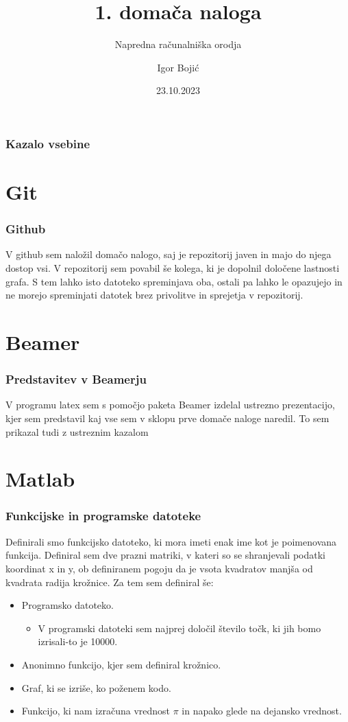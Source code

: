 \documentclass{beamer}
\title{1. domača naloga}
\subtitle{Napredna računalniška orodja}
\author{Igor Bojić}
\institute{Fakulteta za strojništvo}
\date{23.10.2023}
\begin{document}
\frame{\titlepage}
\begin{frame}
    \frametitle{Kazalo vsebine}
    \tableofcontents
\end{frame}
  

\section{Git}
\begin{frame}
\frametitle{Github}
\justifying
V github sem naložil domačo nalogo, saj je repozitorij javen in majo do njega dostop vsi. V repozitorij sem povabil še kolega, ki je dopolnil določene lastnosti grafa. S tem lahko isto datoteko spreminjava oba, ostali pa lahko le opazujejo in ne morejo spreminjati datotek brez privolitve in sprejetja v repozitorij.
\end{frame}

\section{Beamer}

\begin{frame}
\frametitle{Predstavitev v Beamerju}
\justifying
V programu latex sem s pomočjo paketa Beamer izdelal ustrezno prezentacijo, kjer sem predstavil kaj vse sem v sklopu prve domače naloge naredil. To sem prikazal tudi z ustreznim kazalom 
\end{frame}


\section{Matlab}

\begin{frame}
\frametitle{Funkcijske in programske datoteke}

Definirali smo funkcijsko datoteko, ki mora imeti enak ime kot je poimenovana funkcija. Definiral sem dve prazni matriki, v kateri so se shranjevali podatki koordinat x in y, ob definiranem pogoju da je vsota kvadratov manjša od  kvadrata radija krožnice. Za tem sem definiral še:
\begin{itemize}
    \item Programsko datoteko.
    \begin{itemize}
        \item V programski datoteki sem najprej določil število točk, ki jih bomo izrisali-to je 10000.
        \end{itemize}
    \item Anonimno funkcijo, kjer sem definiral krožnico.
    \item Graf, ki se izriše, ko poženem kodo.
    \item Funkcijo, ki nam izračuna vrednost $\pi$ in napako glede na dejansko vrednost. 
\end{itemize}
\end{frame}
\end{document}
